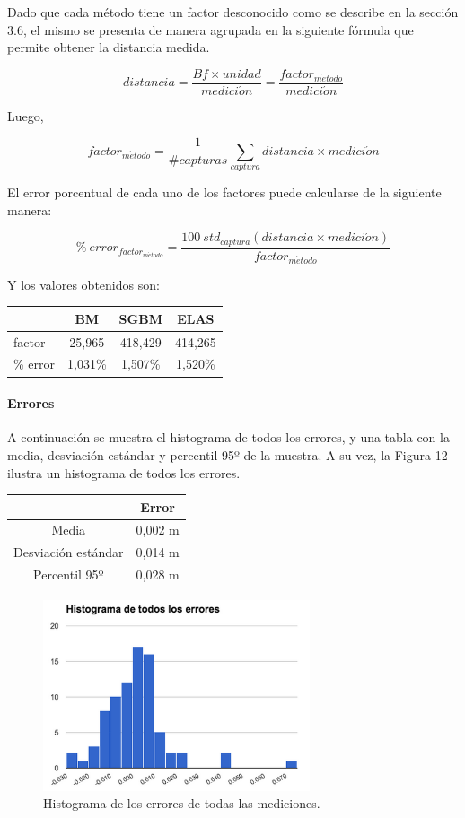 \documentclass[11pt,a4paper,titlepage]{article}
\newcommand{\Figure}[1]{Figura #1}
\begin{document}
Dado que cada método tiene un factor desconocido como se describe en la sección 3.6, el mismo se presenta de manera agrupada en la siguiente fórmula que permite obtener la distancia medida.

\[
    distancia = \frac{Bf \times unidad}{medici\acute{o}n} = \frac{ factor_{m\acute{e}todo} }{ medici\acute{o}n }
\]

Luego,

\[
	factor_{m\acute{e}todo} = \frac{1}{\#capturas} \sum_{captura} {distancia \times medici\acute{o}n}
\]

El error porcentual de cada uno de los factores puede calcularse de la siguiente manera:

\[
	{\%\ error}_{factor_{m\acute{e}todo}} = \frac{100 \  std_{captura}(distancia \times medici\acute{o}n)}{factor_{m\acute{e}todo}}
\]

Y los valores obtenidos son:

\begin{tabular}{ | l | c | c | c | }
	\hline
	& BM & SGBM & ELAS \\
	\hline
	factor & 25,965 & 418,429 & 414,265 \\
	\hline
	\% error & 1,031\% & 1,507\% & 1,520\% \\
	\hline
\end{tabular}

\paragraph{Errores}
\hfill \break
A continuación se muestra el histograma de todos los errores, y una tabla con la media, desviación estándar y percentil 95º de la muestra. A su vez, la \Figure{12} ilustra un histograma de todos los errores.

\begin{tabular}{ | c | c | }
	\hline
	& Error \\
	\hline
	Media & 0,002 m \\
	\hline
	Desviación estándar & 0,014 m \\
	\hline
	Percentil 95º & 0,028 m \\
	\hline
\end{tabular}

\begin{figure}[h!]

  \centering
    \includegraphics[width=0.7\textwidth]{f11.png}
  \caption{Histograma de los errores de todas las mediciones.}
\end{figure}
\end{document}
